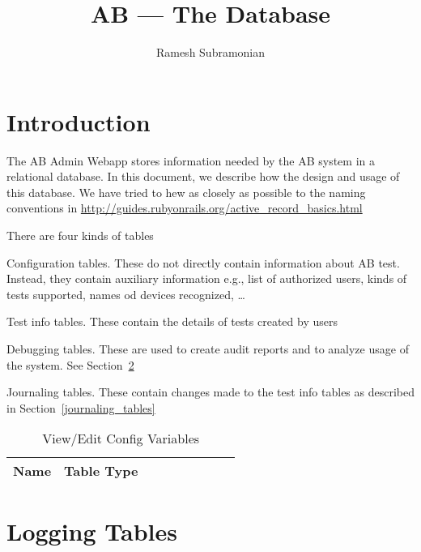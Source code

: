 \documentclass[letterpaper]{article}
\begin{document}
\title{AB --- The Database}
\author{ Ramesh Subramonian }
\maketitle
\thispagestyle{fancy}
\lhead{}
\chead{}
\rhead{}
\cfoot{}
\rfoot{{\small \thepage}}
\section{Introduction}

The AB Admin Webapp stores information needed by the AB system in a relational
database. In this document, we describe how the design and usage of this
database. 
We have tried to hew as closely as possible to the 
naming conventions in
\url{http://guides.rubyonrails.org/active_record_basics.html}

There are four kinds of tables 
\be
\item Configuration tables. These do not directly contain information about AB test.
Instead, they contain auxiliary information e.g., list of authorized users,
kinds of tests supported, names od devices recognized, \ldots
\item Test info tables. These contain the details of tests created by users
\item Debugging tables. These are used to create audit reports and to
  analyze usage of the system. See Section~\ref{logging_tables}
\item Journaling tables. These contain changes made to the test info tables as
described in Section~\ref{journaling_tables}
\ee


\begin{table}[hb]
\centering
\begin{tabular}{|l||l|l|l|l|l|l|l|l|}  \hline \hline
  {\bf Name } & {\bf Table Type} \\ \hline \hline

\hline
\end{tabular}
\caption{View/Edit Config Variables}
\label{tbl_config}
\end{table}

\section{Logging Tables}
\label{logging_tables}
\end{document}
